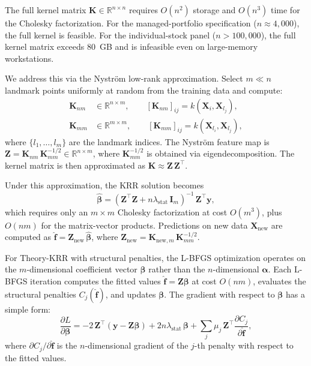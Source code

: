The full kernel matrix $\mathbf{K} \in \mathbb{R}^{n \times n}$ requires $O(n^2)$ storage and $O(n^3)$ time for the Cholesky factorization.
For the managed-portfolio specification ($n \approx 4{,}000$), the full kernel is feasible.
For the individual-stock panel ($n > 100{,}000$), the full kernel matrix exceeds 80~GB and is infeasible even on large-memory workstations.

We address this via the Nystr\"{o}m low-rank approximation.
Select $m \ll n$ landmark points uniformly at random from the training data and compute:
\begin{align}
\mathbf{K}_{nm} &\in \mathbb{R}^{n \times m}, \qquad [\mathbf{K}_{nm}]_{ij} = k(\mathbf{X}_i, \mathbf{X}_{l_j}), \label{eq:nystrom_knm} \\
\mathbf{K}_{mm} &\in \mathbb{R}^{m \times m}, \qquad [\mathbf{K}_{mm}]_{ij} = k(\mathbf{X}_{l_i}, \mathbf{X}_{l_j}), \label{eq:nystrom_kmm}
\end{align}
where $\{l_1, \ldots, l_m\}$ are the landmark indices.
The Nystr\"{o}m feature map is $\mathbf{Z} = \mathbf{K}_{nm}\,\mathbf{K}_{mm}^{-1/2} \in \mathbb{R}^{n \times m}$, where $\mathbf{K}_{mm}^{-1/2}$ is obtained via eigendecomposition.
The kernel matrix is then approximated as $\mathbf{K} \approx \mathbf{Z}\,\mathbf{Z}^\top$.

Under this approximation, the KRR solution becomes
\begin{equation}
\label{eq:nystrom_solve}
\hat{\boldsymbol{\beta}} = (\mathbf{Z}^\top\mathbf{Z} + n\lambda_{\mathrm{stat}}\,\mathbf{I}_m)^{-1}\,\mathbf{Z}^\top\mathbf{y},
\end{equation}
which requires only an $m \times m$ Cholesky factorization at cost $O(m^3)$, plus $O(nm)$ for the matrix-vector products.
Predictions on new data $\mathbf{X}_{\mathrm{new}}$ are computed as $\hat{\mathbf{f}} = \mathbf{Z}_{\mathrm{new}}\,\hat{\boldsymbol{\beta}}$, where $\mathbf{Z}_{\mathrm{new}} = \mathbf{K}_{\mathrm{new},m}\,\mathbf{K}_{mm}^{-1/2}$.

For Theory-KRR with structural penalties, the L-BFGS optimization operates on the $m$-dimensional coefficient vector $\boldsymbol{\beta}$ rather than the $n$-dimensional $\boldsymbol{\alpha}$.
Each L-BFGS iteration computes the fitted values $\hat{\mathbf{f}} = \mathbf{Z}\boldsymbol{\beta}$ at cost $O(nm)$, evaluates the structural penalties $C_j(\hat{\mathbf{f}})$, and updates $\boldsymbol{\beta}$.
The gradient with respect to $\boldsymbol{\beta}$ has a simple form:
\begin{equation}
\label{eq:nystrom_gradient}
\frac{\partial L}{\partial \boldsymbol{\beta}} = -2\,\mathbf{Z}^\top(\mathbf{y} - \mathbf{Z}\boldsymbol{\beta}) + 2n\lambda_{\mathrm{stat}}\,\boldsymbol{\beta} + \sum_{j} \mu_j\,\mathbf{Z}^\top\frac{\partial C_j}{\partial \hat{\mathbf{f}}},
\end{equation}
where $\partial C_j / \partial \hat{\mathbf{f}}$ is the $n$-dimensional gradient of the $j$-th penalty with respect to the fitted values.

